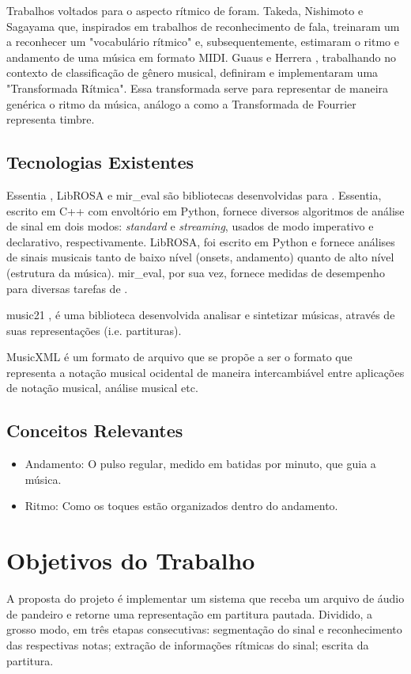\documentclass[
  dissertacao,
  brazil
]{ThesisPUC}
\begin{document}
Trabalhos voltados para o aspecto rítmico de \TAM \space foram. Takeda, Nishimoto e Sagayama \cite{takeda2007rhythm} que, inspirados em trabalhos de reconhecimento de fala, treinaram um \HMM\space a reconhecer um "vocabulário rítmico" e, subsequentemente, estimaram o ritmo e andamento de uma música em formato MIDI.
Guaus e Herrera \cite{guaus2005rhythm}, trabalhando no contexto de classificação de gênero musical, definiram e implementaram uma "Transformada Rítmica". Essa transformada serve para representar de maneira genérica o ritmo da música, análogo a como a Transformada de Fourrier representa timbre.


\section{Tecnologias Existentes}
Essentia \cite{bogdanov2013essentia}, LibROSA \cite{mcfee2015librosaDesign} e mir\_eval \cite{raffel2014mir_eval} são bibliotecas desenvolvidas para \MIR. Essentia, escrito em C++ com envoltório em Python, fornece diversos algoritmos de análise de sinal em dois modos: \emph{standard} e \emph{streaming}, usados de modo imperativo e declarativo, respectivamente. LibROSA, foi escrito em Python e fornece análises de sinais musicais tanto de baixo nível (onsets, andamento) quanto de alto nível (estrutura da música). mir\_eval, por sua vez, fornece medidas de desempenho para diversas tarefas de \MIR.

music21 \cite{cuthbert2010music21}, é uma biblioteca desenvolvida analisar e sintetizar músicas, através de suas representações (i.e. partituras).

MusicXML \cite{good2001musicxml} é um formato de arquivo que se propõe a ser o formato que representa a notação musical ocidental de maneira intercambiável entre aplicações de notação musical, análise musical etc.

\section{Conceitos Relevantes}
\begin{itemize}
    \item Andamento: O pulso regular, medido em batidas por minuto, que guia a música.
    \item Ritmo: Como os toques estão organizados dentro do andamento.
\end{itemize}



\chapter{Objetivos do Trabalho}
A proposta do projeto é implementar um sistema que receba um arquivo de áudio de pandeiro e retorne uma representação em partitura pautada. Dividido, a grosso modo, em três etapas consecutivas: segmentação do sinal e reconhecimento das respectivas notas; extração de informações rítmicas do sinal; escrita da partitura.
\end{document}
